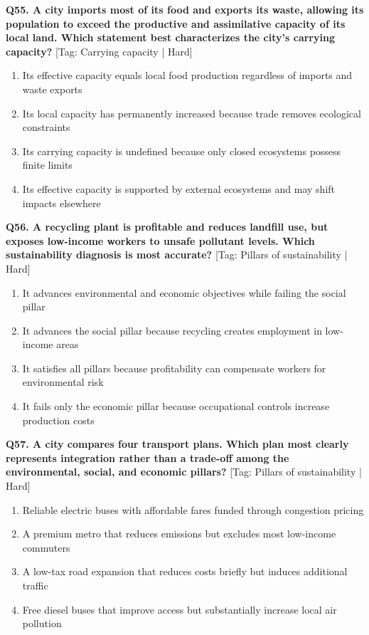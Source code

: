 \noindent\textbf{Q55. A city imports most of its food and exports its waste, allowing its population to exceed the productive and assimilative capacity of its local land. Which statement best characterizes the city's carrying capacity?} \hfill [Tag: Carrying capacity | Hard]
\begin{enumerate}[label=(\alph*),topsep=2pt,itemsep=1pt,partopsep=0pt,parsep=0pt]
    \item {Its effective capacity equals local food production regardless of imports and waste exports}
    \item {Its local capacity has permanently increased because trade removes ecological constraints}
    \item {Its carrying capacity is undefined because only closed ecosystems possess finite limits}
    \item {Its effective capacity is supported by external ecosystems and may shift impacts elsewhere}
\end{enumerate}
\vspace{2mm}

\noindent\textbf{Q56. A recycling plant is profitable and reduces landfill use, but exposes low-income workers to unsafe pollutant levels. Which sustainability diagnosis is most accurate?} \hfill [Tag: Pillars of sustainability | Hard]
\begin{enumerate}[label=(\alph*),topsep=2pt,itemsep=1pt,partopsep=0pt,parsep=0pt]
    \item {It advances environmental and economic objectives while failing the social pillar}
    \item {It advances the social pillar because recycling creates employment in low-income areas}
    \item {It satisfies all pillars because profitability can compensate workers for environmental risk}
    \item {It fails only the economic pillar because occupational controls increase production costs}
\end{enumerate}
\vspace{2mm}

\noindent\textbf{Q57. A city compares four transport plans. Which plan most clearly represents integration rather than a trade-off among the environmental, social, and economic pillars?} \hfill [Tag: Pillars of sustainability | Hard]
\begin{enumerate}[label=(\alph*),topsep=2pt,itemsep=1pt,partopsep=0pt,parsep=0pt]
    \item {Reliable electric buses with affordable fares funded through congestion pricing}
    \item {A premium metro that reduces emissions but excludes most low-income commuters}
    \item {A low-tax road expansion that reduces costs briefly but induces additional traffic}
    \item {Free diesel buses that improve access but substantially increase local air pollution}
\end{enumerate}
\vspace{2mm}

